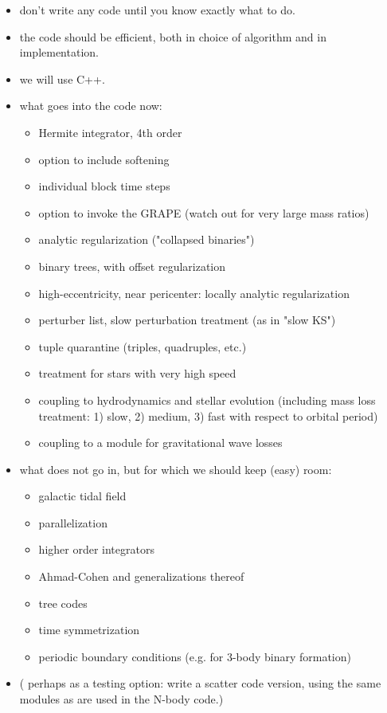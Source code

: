 \documentclass{article}[12pt]
\begin{document}
\begin{itemize}

\item don't write any code until you know exactly what to do.

\item the code should be efficient, both in choice of algorithm and in
    implementation.

\item we will use C++.

\item what goes into the code now:
\begin{itemize}
    \item Hermite integrator, 4th order
    \item option to include softening
    \item individual block time steps
    \item option to invoke the GRAPE (watch out for very large mass ratios)
    \item analytic regularization ("collapsed binaries")
    \item binary trees, with offset regularization
    \item high-eccentricity, near pericenter: locally analytic regularization
    \item perturber list, slow perturbation treatment (as in "slow KS")
    \item tuple quarantine (triples, quadruples, etc.)
    \item treatment for stars with very high speed
    \item coupling to hydrodynamics and stellar evolution (including mass loss
         treatment: 1) slow, 2) medium, 3) fast with respect to orbital period)
    \item coupling to a module for gravitational wave losses
\end{itemize}

\item what does not go in, but for which we should keep (easy) room:
\begin{itemize}
    \item galactic tidal field
    \item parallelization
    \item higher order integrators
    \item Ahmad-Cohen and generalizations thereof
    \item tree codes
    \item time symmetrization
    \item periodic boundary conditions (e.g. for 3-body binary formation)

\end{itemize}
\item ( perhaps as a testing option: write a scatter code version, using
      the same modules as are used in the N-body code.)

\end{itemize}
\end{document}
